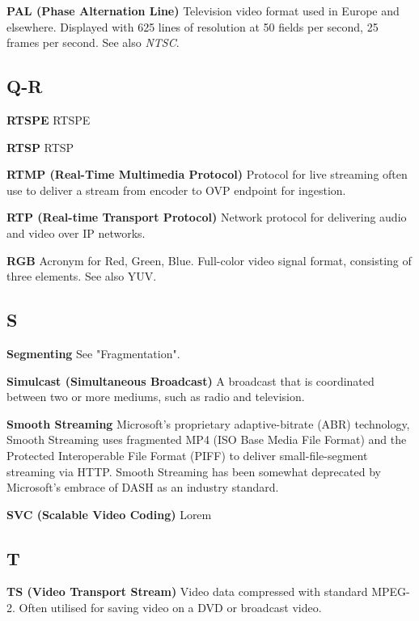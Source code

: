 \smallskip
\textbf{PAL (Phase Alternation Line)}
Television video format used in Europe and elsewhere. Displayed with 625 lines of resolution at 50 fields per second, 25 frames per second. See also \textit{NTSC}.


\subsection{Q-R}

\smallskip
\textbf{RTSPE}
RTSPE

\smallskip
\textbf{RTSP}
RTSP

\smallskip
\textbf{RTMP (Real-Time Multimedia Protocol)}
Protocol for live streaming often use to deliver a stream from encoder to OVP endpoint for ingestion.

\smallskip
\textbf{RTP (Real-time Transport Protocol)}
Network protocol for delivering audio and video over IP networks.

\smallskip
\textbf{RGB}
Acronym for Red, Green, Blue. Full-color video signal format, consisting of three elements. See also YUV.


\subsection{S}

\smallskip
\textbf{Segmenting}
See "Fragmentation".

\smallskip
\textbf{Simulcast (Simultaneous Broadcast)}
A broadcast that is coordinated between two or more mediums, such as radio and television.

\smallskip
\textbf{Smooth Streaming}
Microsoft’s proprietary adaptive-bitrate (ABR) technology, Smooth Streaming uses fragmented MP4 (ISO Base Media File Format) and the Protected Interoperable File Format (PIFF) to deliver small-file-segment streaming via HTTP. Smooth Streaming has been somewhat deprecated by Microsoft’s embrace of DASH as an industry standard.

\smallskip
\textbf{SVC (Scalable Video Coding)}
Lorem

\subsection{T}

\smallskip
\textbf{TS (Video Transport Stream)}
Video data compressed with standard MPEG-2. Often utilised for saving video on a DVD or broadcast video.


